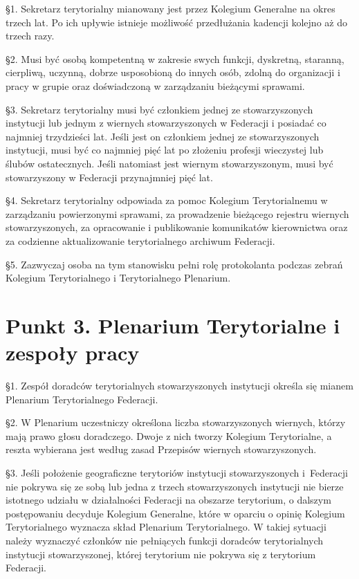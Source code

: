  \S{}1. Sekretarz terytorialny mianowany jest przez Kolegium Generalne na okres trzech lat. Po ich upływie istnieje możliwość przedłużania kadencji kolejno aż do trzech razy.

\S{}2. Musi być osobą kompetentną w zakresie swych funkcji, dyskretną, staranną, cierpliwą, uczynną, dobrze usposobioną do innych osób, zdolną do organizacji i pracy w grupie oraz doświadczoną w zarządzaniu bieżącymi sprawami.

\S{}3. Sekretarz terytorialny musi być członkiem jednej ze stowarzyszonych instytucji lub jednym z wiernych stowarzyszonych w Federacji i posiadać co najmniej trzydzieści lat. Jeśli jest on członkiem jednej ze stowarzyszonych instytucji, musi być co najmniej pięć lat po złożeniu profesji wieczystej lub ślubów ostatecznych. Jeśli natomiast jest wiernym stowarzyszonym, musi być stowarzyszony w Federacji przynajmniej pięć lat.

\S{}4. Sekretarz terytorialny odpowiada za pomoc Kolegium Terytorialnemu w zarządzaniu powierzonymi sprawami, za prowadzenie bieżącego rejestru wiernych stowarzyszonych, za opracowanie i publikowanie komunikatów kierownictwa oraz za codzienne aktualizowanie terytorialnego archiwum Federacji.

\S{}5. Zazwyczaj osoba na tym stanowisku pełni rolę protokolanta podczas zebrań Kolegium Terytorialnego i Terytorialnego Plenarium.


\section{Punkt 3. Plenarium Terytorialne i zespoły pracy}


 \S{}1. Zespół doradców terytorialnych stowarzyszonych instytucji określa się mianem Plenarium Terytorialnego Federacji.

\S{}2. W Plenarium uczestniczy określona liczba stowarzyszonych wiernych, którzy mają prawo głosu doradczego. Dwoje z nich tworzy Kolegium Terytorialne, a reszta wybierana jest według zasad Przepisów wiernych stowarzyszonych.

\S{}3. Jeśli położenie geograficzne terytoriów instytucji stowarzyszonych \mbox{i Federacji} nie pokrywa się ze sobą lub jedna z trzech stowarzyszonych instytucji nie bierze istotnego udziału w działalności Federacji na obszarze terytorium, o dalszym postępowaniu decyduje Kolegium Generalne, które w oparciu o opinię Kolegium Terytorialnego wyznacza skład Plenarium Terytorialnego. W takiej sytuacji należy wyznaczyć członków nie pełniących funkcji doradców terytorialnych instytucji stowarzyszonej, której terytorium nie pokrywa się z terytorium Federacji.

